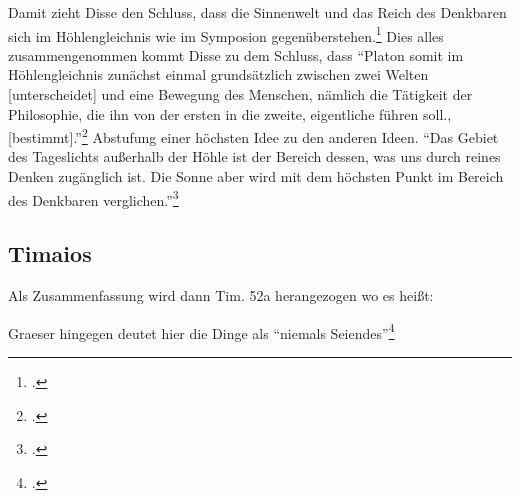 Damit zieht Disse den Schluss, dass die Sinnenwelt und das Reich des Denkbaren sich im Höhlengleichnis wie im Symposion gegenüberstehen.\footcite[vgl.][S. 28]{DisseMetaphysik}
Dies alles zusammengenommen kommt Disse zu dem Schluss, dass \enquote{Platon somit im Höhlengleichnis zunächst einmal grundsätzlich zwischen zwei Welten [unterscheidet] und eine Bewegung des Menschen, nämlich die Tätigkeit der Philosophie, die ihn von der ersten in die zweite, eigentliche führen soll., [bestimmt].}\footcite[vgl.][S. 23f.]{DisseMetaphysik}
Abstufung einer höchsten Idee zu den anderen Ideen.
\enquote{Das Gebiet des Tageslichts außerhalb der Höhle ist der Bereich dessen, was uns durch reines Denken zugänglich ist. Die Sonne aber wird mit dem höchsten Punkt im Bereich des Denkbaren verglichen.}\footcite[][S. 49]{DisseMetaphysik}

\subsection{Timaios}
Als Zusammenfassung wird dann Tim. 52a herangezogen wo es heißt:

 Graeser hingegen deutet hier die Dinge als \enquote{niemals Seiendes}\footcite[vgl.][S. 140]{GraeserPhiloGeschichte}




